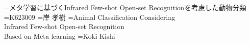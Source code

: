 \documentclass[a4paper,11pt,nomag]{jsreport} %
\begin{document}
{}={メタ学習に基づくInfrared Few-shot Open-set Recognitionを考慮した動物分類}
={K623009}           %
={岸 孝樹}             %
={Animal Classification Considering \\ Infrared Few-shot Open-set Recognition \\ Based on Meta-learning} %
={Koki Kishi}
\MakeTitle
\newpage
\begin{abstract}\hspace{0.5zw}
  
\end{abstract}







\tocack    %






\tocpub    %


\tocbib


\end{document}
